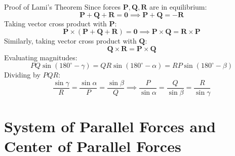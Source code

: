 \begin{proofbox}{Proof of Lami's Theorem}
Since forces $\mathbf{P}, \mathbf{Q}, \mathbf{R}$ are in equilibrium:
\[
\mathbf{P} + \mathbf{Q} + \mathbf{R} = \mathbf{0} \implies \mathbf{P} + \mathbf{Q} = -\mathbf{R}
\]
Taking vector cross product with $\mathbf{P}$:
\[
\mathbf{P} \times (\mathbf{P} + \mathbf{Q} + \mathbf{R}) = \mathbf{0} \implies \mathbf{P} \times \mathbf{Q} = \mathbf{R} \times \mathbf{P}
\]
Similarly, taking vector cross product with $\mathbf{Q}$:
\[
\mathbf{Q} \times \mathbf{R} = \mathbf{P} \times \mathbf{Q}
\]
Evaluating magnitudes:
\[
P Q \sin(180^\circ - \gamma) = Q R \sin(180^\circ - \alpha) = R P \sin(180^\circ - \beta)
\]
Dividing by $P Q R$:
\[
\frac{\sin\gamma}{R} = \frac{\sin\alpha}{P} = \frac{\sin\beta}{Q} \implies \frac{P}{\sin\alpha} = \frac{Q}{\sin\beta} = \frac{R}{\sin\gamma}
\]
\end{proofbox}

\section{System of Parallel Forces and Center of Parallel Forces}

